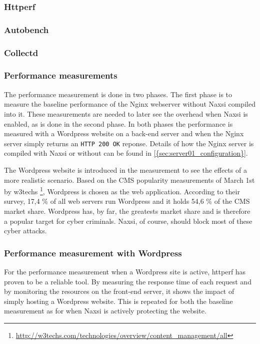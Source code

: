 \documentclass[Methods]{subfiles}
\begin{document}
\subsubsection{Httperf}
%

\subsubsection{Autobench}


\subsubsection{Collectd}


\subsubsection{Performance measurements}
The performance measurement is done in two phases. The first phase is to measure the baseline performance of the Nginx webserver without Naxsi compiled into it. These measurements are needed to later see the overhead when Naxsi is enabled, as is done in the second phase. In both phases the performance is measured with a Wordpress website on a back-end server and when the Nginx server simply returns an \verb+HTTP 200 OK+ reponse. Details of how the Nginx server is compiled with Naxsi or without can be found in \ref{{sec:server01_configuration}}.

The Wordpress website is introduced in the measurement to see the effects of a more realistic scenario. Based on the \ac{CMS} popularity measurements of March 1st by w3techs \footnote{\url{http://w3techs.com/technologies/overview/content_management/all}}, Wordpress is chosen as the web application. According to their survey, 17,4 \% of all web servers run Wordpress and it holds 54,6 \% of the CMS market share. Wordpress has, by far, the greatests market share and is therefore a popular target for cyber criminals. Naxsi, of course, should block most of these cyber attacks.

\subsubsection{Performance measurement with Wordpress}
For the performance measurement when a Wordpress site is active, httperf has proven to be a reliable tool. By measuring the response time of each request and by monitoring the resources on the front-end server, it shows the impact of simply hosting a Wordpress website. This is repeated for both the baseline measurement as for when Naxsi is actively protecting the website.
\end{document}
